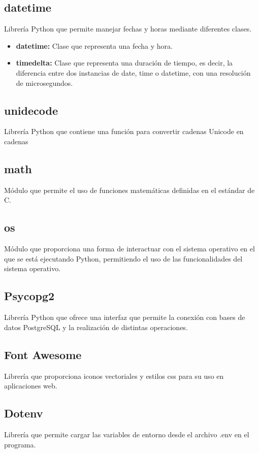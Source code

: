 \subsection{datetime}
\cite{datetime} Librería Python que permite manejar fechas y horas mediante diferentes clases.

\begin{itemize}
    \item \textbf{datetime:} Clase que representa una fecha y hora.
    \item \textbf{timedelta:} Clase que representa una duración de tiempo, es decir, la diferencia entre dos instancias de date, time o datetime, con una resolución de microsegundos.
\end{itemize}

\subsection{unidecode}
\cite{unidecode} Librería Python que contiene una función para convertir cadenas Unicode en cadenas 

\subsection{math}
\cite{math} Módulo que permite el uso de funciones matemáticas definidas en el estándar de C.

\subsection{os}
\cite{os} Módulo que proporciona una forma de interactuar con el sistema operativo en el que se está ejecutando Python, permitiendo el uso de las funcionalidades del sistema operativo.

\subsection{Psycopg2}
\cite{psycopg2} Librería Python que ofrece una interfaz que permite la conexión con bases de datos PostgreSQL y la realización de distintas operaciones.

\subsection{Font Awesome}
\cite{font} Librería que proporciona iconos vectoriales y estilos css para su uso en aplicaciones web.

\subsection{Dotenv}
\cite{dotenv} Librería que permite cargar las variables de entorno desde el archivo .env en el programa.